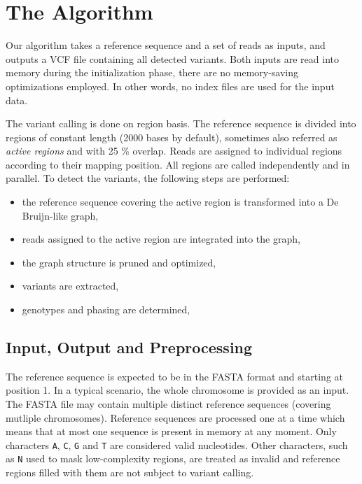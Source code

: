 \chapter{The Algorithm}
\label{chap:the-algorithm}

Our algorithm takes a reference sequence and a set of reads as inputs, and outputs a VCF file containing all detected variants. Both inputs are read into memory during the initialization phase, there are no memory-saving optimizations employed. In other words, no index files are used for the input data.

The variant calling is done on region basis. The reference sequence is divided into regions of constant length (2000 bases by default), sometimes also referred as \textit{active regions} and with 25 \% overlap. Reads are assigned to individual regions according to their mapping position. All regions are called independently and in parallel. To detect the variants, the following steps are performed:
\begin{itemize}
\item the reference sequence covering the active region is transformed into a De Bruijn-like graph,
\item reads assigned to the active region are integrated into the graph,
\item the graph structure is pruned and optimized,
\item variants are extracted,
\item genotypes and phasing are determined,
\end{itemize}

\section{Input, Output and Preprocessing}
\label{sec:input-output-and-preprocessing}

The reference sequence is expected to be in the FASTA format and starting at position 1. In a typical scenario, the whole chromosome is provided as an input. The FASTA file may contain multiple distinct reference sequences (covering mutliple chromosomes). Reference sequences are processed one at a time which means that at most one sequence is present in memory at any moment. Only characters \texttt{A}, \texttt{C}, \texttt{G} and \texttt{T} are considered valid nucleotides. Other characters, such as \texttt{N} used to mask low-complexity regions, are treated as invalid and reference regions filled with them are not subject to variant calling.

